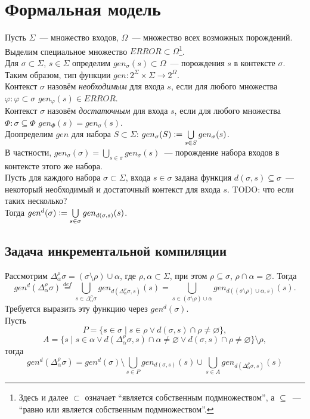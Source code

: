 \newpage
\tableofcontents

\section{Формальная модель}

Пусть $\Sigma$~--- множество входов, $\Omega$~--- множество всех возможных порождений. Выделим специальное множество $ERROR \subset \Omega$\footnote{Здесь и далее $\subset$ означает ``является собственным подмножеством'', а $\subseteq$~--- ``равно или является собственным подмножеством''.}.\\
Для $\sigma \subset \Sigma$, $s \in \Sigma$ определим $gen_\sigma(s) \subset \Omega$~--- порождения $s$ в контексте $\sigma$. Таким образом, тип функции $gen: 2^\Sigma \times \Sigma \to 2^\Omega$.\\
Контекст $\sigma$ назовём \textit{необходимым} для входа $s$, если для любого множества $\varphi: \varphi \subset \sigma$ $gen_\varphi(s) \in ERROR$.\\
Контекст $\sigma$ назовём \textit{достаточным} для входа $s$, если для любого множества $\Phi: \sigma \subseteq \Phi$ $gen_\Phi(s) = gen_\sigma(s)$.\\
Доопределим $gen$ для набора $S \subset \Sigma$: $gen_\sigma(S) \vcentcolon= \bigcup\limits_{s \in S} gen_\sigma(s)$.\\
В частности, $gen_\sigma(\sigma) = \bigcup\limits_{s \in \sigma} gen_\sigma(s)$~--- порождение набора входов в контексте этого же набора.\\
Пусть для каждого набора $\sigma \subset \Sigma$, входа $s \in \sigma$ задана функция $d(\sigma, s) \subseteq \sigma$~--- некоторый необходимый и достаточный контекст для входа $s$. TODO: что если таких несколько?\\
Тогда $gen^d(\sigma) \vcentcolon= \bigcup\limits_{s \in \sigma} gen_{d(\sigma, s)}(s)$.

\subsection{Задача инкрементальной компиляции}

\newcommand{\Deltasigma}{\Delta_\alpha^\rho\sigma}
Рассмотрим $\Deltasigma = (\sigma \setminus \rho) \cup \alpha$, где $\rho, \alpha \subset \Sigma$, при этом $\rho \subseteq \sigma$, $\rho \cap \alpha = \varnothing$. Тогда
$$gen^d(\Deltasigma) \overset{def}{=} \bigcup\limits_{s \in \Deltasigma} gen_{d(\Deltasigma, s)}(s) = \bigcup\limits_{s \in (\sigma \setminus \rho) \cup \alpha} gen_{d((\sigma \setminus \rho) \cup \alpha, s)}(s).$$
Требуется выразить эту функцию через $gen^d(\sigma)$.\\
Пусть
$$P = \{s \in \sigma \mid s \in \rho \vee d(\sigma, s) \cap \rho \neq \varnothing \},$$
$$A = \{s \mid s \in \alpha \vee d(\Deltasigma, s) \cap \alpha \neq \varnothing \vee d(\sigma, s) \cap \rho \neq \varnothing \} \setminus \rho,$$
тогда
$$gen^d(\Deltasigma) = gen^d(\sigma) \setminus \bigcup\limits_{s \in P} gen_{d(\sigma, s)}(s) \cup \bigcup\limits_{s \in A} gen_{d(\Deltasigma, s)}(s)$$

